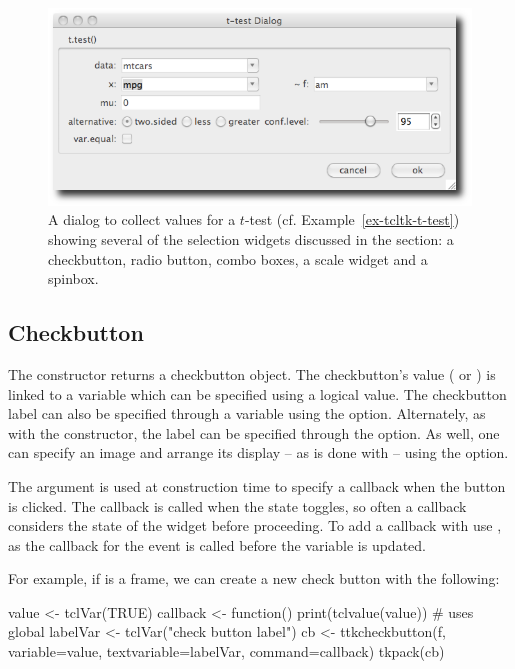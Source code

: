 \begin{figure}
  \centering
  \includegraphics[width=.75\textwidth]{fig-tcltk-t-test.png}
  \caption{A dialog to collect values for a $t$-test (cf.
    Example~\ref{ex-tcltk-t-test}) showing several of the selection
    widgets discussed in the section: a checkbutton, radio button,
    combo boxes, a scale widget and a spinbox.}
  \label{fig:fig-tcltk-t-test}
\end{figure}

\subsection{Checkbutton}
\label{sec:tcltk:checkboxes}

The  constructor returns a checkbutton
object. The checkbutton's value ( or ) is linked
to a \TCL\/ variable which can be specified using a logical value.
The checkbutton label can also be specified through a \TCL\/ variable
using the  option.  Alternately,
as with the  constructor, the label can be specified
through the  option. As well, one can
specify an image and arrange its display -- as is done with
 -- using the 
option.

The  argument is used at construction
time to specify a callback when the button is clicked. The callback is
called when the state toggles, so often a callback considers the state
of the widget before proceeding.  To add a callback with
 use , as the callback
for the event  is called before the variable is
updated.

For example, if  is a frame, we can create a new check button
with the following:

\begin{Schunk}
\begin{Sinput}
 value <- tclVar(TRUE)
 callback <- function() print(tclvalue(value))   # uses global
 labelVar <- tclVar("check button label")
 cb <- ttkcheckbutton(f, variable=value, 
                      textvariable=labelVar, command=callback)
 tkpack(cb)
\end{Sinput}
\end{Schunk}


